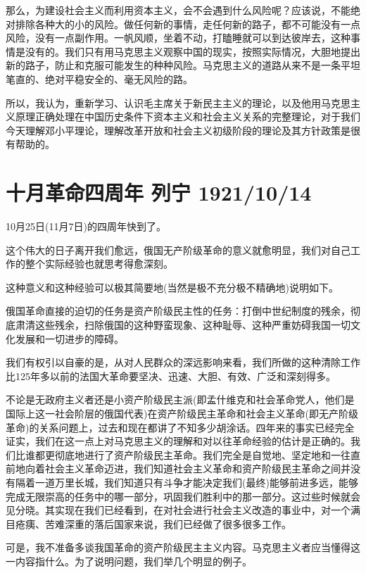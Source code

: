 \documentclass[UTF8, 12pt, a4paper]{ctexrep}
\begin{document}
那么，为建设社会主义而利用资本主义，会不会遇到什么风险呢？应该说，不能绝对排除各种大的小的风险。做任何新的事情，走任何新的路子，都不可能没有一点风险，没有一点副作用。一帆风顺，坐着不动，打瞌睡就可以到达彼岸去，这种事情是没有的。我们只有用马克思主义观察中国的现实，按照实际情况，大胆地提出新的路子，防止和克服可能发生的种种风险。马克思主义的道路从来不是一条平坦笔直的、绝对平稳安全的、毫无风险的路。

所以，我认为，重新学习、认识毛主席关于新民主主义的理论，以及他用马克思主义原理正确处理在中国历史条件下资本主义和社会主义关系的完整理论，对于我们今天理解邓小平理论，理解改革开放和社会主义初级阶段的理论及其方针政策是很有帮助的。

\newpage
\chapter{十月革命四周年 列宁 1921/10/14}
\newpage

10月25日(11月7日)的四周年快到了。

这个伟大的日子离开我们愈远，俄国无产阶级革命的意义就愈明显，我们对自己工作的整个实际经验也就思考得愈深刻。

这种意义和这种经验可以极其简要地(当然是极不充分极不精确地)说明如下。

俄国革命直接的迫切的任务是资产阶级民主性的任务：打倒中世纪制度的残余，彻底肃清这些残余，扫除俄国的这种野蛮现象、这种耻辱、这种严重妨碍我国一切文化发展和一切进步的障碍。

我们有权引以自豪的是，从对人民群众的深远影响来看，我们所做的这种清除工作比125年多以前的法国大革命要坚决、迅速、大胆、有效、广泛和深刻得多。

不论是无政府主义者还是小资产阶级民主派(即孟什维克和社会革命党人，他们是国际上这一社会阶层的俄国代表)在资产阶级民主革命和社会主义革命(即无产阶级革命)的关系问题上，过去和现在都讲了不知多少胡涂话。四年来的事实已经完全证实，我们在这一点上对马克思主义的理解和对以往革命经验的估计是正确的。我们比谁都更彻底地进行了资产阶级民主革命。我们完全是自觉地、坚定地和一往直前地向着社会主义革命迈进，我们知道社会主义革命和资产阶级民主革命之间并没有隔着一道万里长城，我们知道只有斗争才能决定我们(最终)能够前进多远，能够完成无限崇高的任务中的哪一部分，巩固我们胜利中的那一部分。这过些时候就会见分晓。其实现在我们已经看到，在对社会进行社会主义改造的事业中，对一个满目疮痍、苦难深重的落后国家来说，我们已经做了很多很多工作。

可是，我不准备多谈我国革命的资产阶级民主主义内容。马克思主义者应当懂得这一内容指什么。为了说明问题，我们举几个明显的例子。
\end{document}
